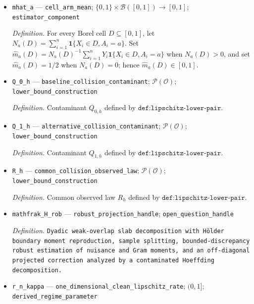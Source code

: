 \documentclass{article}
\begin{document}
\begin{itemize}
  \item \texttt{mhat\_\allowbreak{}a} --- \texttt{cell\_\allowbreak{}arm\_\allowbreak{}mean}; \(\{0,1\}\times\mathcal B([0,1])\to[0,1]\); \texttt{estimator\_\allowbreak{}component}
  \par\smallskip\noindent\emph{Definition.} For every Borel cell \(D\subseteq[0,1]\), let \(N_a(D)=\sum_{i=1}^n\mathbf 1\{X_i\in D,A_i=a\}\). Set \(\widehat m_a(D)=N_a(D)^{-1}\sum_{i=1}^nY_i\mathbf 1\{X_i\in D,A_i=a\}\) when \(N_a(D)>0\), and set \(\widehat m_a(D)=1/2\) when \(N_a(D)=0\); hence \(\widehat m_a(D)\in[0,1]\).
  \item \texttt{Q\_\allowbreak{}0\_\allowbreak{}h} --- \texttt{baseline\_\allowbreak{}collision\_\allowbreak{}contaminant}; \(\mathcal P(\mathcal O)\); \texttt{lower\_\allowbreak{}bound\_\allowbreak{}construction}
  \par\smallskip\noindent\emph{Definition.} Contaminant \(Q_{0,h}\) defined by \(\texttt{def:lipschitz-lower-pair}\).
  \item \texttt{Q\_\allowbreak{}1\_\allowbreak{}h} --- \texttt{alternative\_\allowbreak{}collision\_\allowbreak{}contaminant}; \(\mathcal P(\mathcal O)\); \texttt{lower\_\allowbreak{}bound\_\allowbreak{}construction}
  \par\smallskip\noindent\emph{Definition.} Contaminant \(Q_{1,h}\) defined by \(\texttt{def:lipschitz-lower-pair}\).
  \item \texttt{R\_\allowbreak{}h} --- \texttt{common\_\allowbreak{}collision\_\allowbreak{}observed\_\allowbreak{}law}; \(\mathcal P(\mathcal O)\); \texttt{lower\_\allowbreak{}bound\_\allowbreak{}construction}
  \par\smallskip\noindent\emph{Definition.} Common observed law \(R_h\) defined by \(\texttt{def:lipschitz-lower-pair}\).
  \item \texttt{mathfrak\_\allowbreak{}H\_\allowbreak{}rob} --- \texttt{robust\_\allowbreak{}projection\_\allowbreak{}handle}; \texttt{open\_\allowbreak{}question\_\allowbreak{}handle}
  \par\smallskip\noindent\emph{Definition.} \texttt{Dyadic weak-\allowbreak{}overlap slab decomposition with Hölder boundary moment reproduction,\allowbreak{} sample splitting,\allowbreak{} bounded-\allowbreak{}discrepancy robust estimation of nuisance and Gram moments,\allowbreak{} and an off-\allowbreak{}diagonal projected correction analyzed by a contaminated Hoeffding decomposition.}
  \item \texttt{r\_\allowbreak{}n\_\allowbreak{}kappa} --- \texttt{one\_\allowbreak{}dimensional\_\allowbreak{}clean\_\allowbreak{}lipschitz\_\allowbreak{}rate}; \((0,1]\); \texttt{derived\_\allowbreak{}regime\_\allowbreak{}parameter}

\end{itemize}
\end{document}
